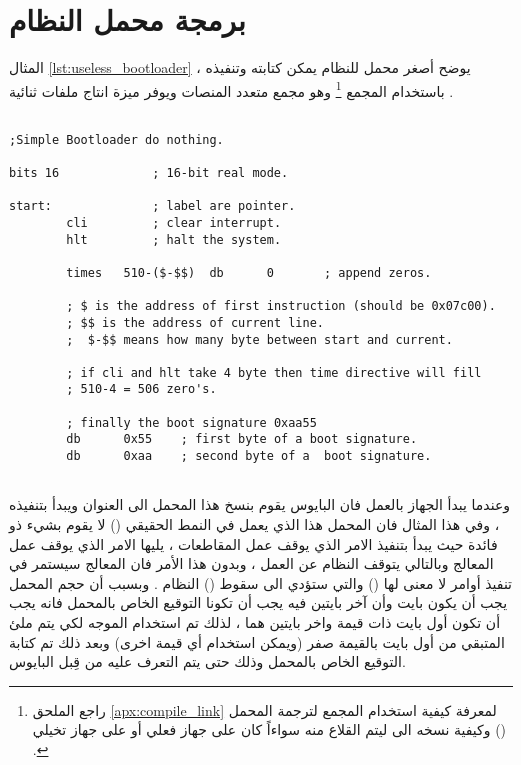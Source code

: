 \documentclass[document.tex]{subfiles}
\begin{document}
\section{برمجة محمل النظام}
المثال \ref{lst:useless_bootloader} يوضح أصغر محمل للنظام يمكن كتابته وتنفيذه ، باستخدام المجمع \footnote{راجع الملحق \ref{apx:compile_link} لمعرفة كيفية استخدام المجمع لترجمة المحمل وكيفية نسخه الى  ليتم القلاع منه سواءاً كان على جهاز فعلي أو على جهاز تخيلي () .} وهو مجمع متعدد المنصات ويوفر ميزة انتاج ملفات ثنائية  .\\

%

\begin{english}
\lstset{numberstyle=\tiny,numbers=left,stepnumber=1,numbersep=5pt,tabsize=2,extendedchars=true,breaklines=true,frame=b,showspaces=false, showtabs=false,xleftmargin=10pt,framexleftmargin=10pt,framexrightmargin=5pt,framexbottommargin=4pt,showstringspaces=false,language=[x86masm]Assembler}

\begin{lstlisting}[label=lst:useless_bootloader,caption=\en{Smallest Bootloader}]

;Simple Bootloader do nothing.

bits 16				; 16-bit real mode.

start:				; label are pointer.
		cli			; clear interrupt.		
		hlt			; halt the system.
		
		times	510-($-$$)	db		0		; append zeros.
		
		; $ is the address of first instruction (should be 0x07c00).
		; $$ is the address of current line.
		;  $-$$ means how many byte between start and current.
		
		; if cli and hlt take 4 byte then time directive will fill
		; 510-4 = 506 zero's.
		
		; finally the boot signature 0xaa55
		db		0x55	; first byte of a boot signature.
		db		0xaa	; second byte of a  boot signature.
		
\end{lstlisting}
\end{english}

وعندما يبدأ الجهاز بالعمل فان البايوس يقوم بنسخ هذا المحمل الى العنوان  ويبدأ بتنفيذه ، وفي هذا المثال فان المحمل هذا الذي يعمل في النمط الحقيقي () لا يقوم بشيء ذو فائدة حيث يبدأ بتنفيذ الامر  الذي يوقف عمل المقاطعات ، يليها الامر  الذي يوقف عمل المعالج وبالتالي يتوقف النظام عن العمل ، وبدون هذا الأمر فان المعالج سيستمر في تنفيذ أوامر لا معنى لها () والتي ستؤدي الى سقوط () النظام .  
وبسبب أن حجم المحمل يجب أن يكون  بايت وأن آخر بايتين فيه يجب أن تكونا التوقيع الخاص بالمحمل فانه يجب أن تكون أول  بايت ذات قيمة واخر بايتين هما  ، لذلك تم استخدام الموجه  لكي يتم ملئ المتبقي من أول  بايت بالقيمة صفر (ويمكن استخدام أي قيمة اخرى) وبعد ذلك تم كتابة التوقيع الخاص بالمحمل وذلك حتى يتم التعرف عليه من قِبل البايوس.
\end{document}
